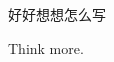 
\begin{CHSabstract}
    好好想想怎么写

\end{CHSabstract}

\begin{ENGabstract}
Think more.
\end{ENGabstract}


